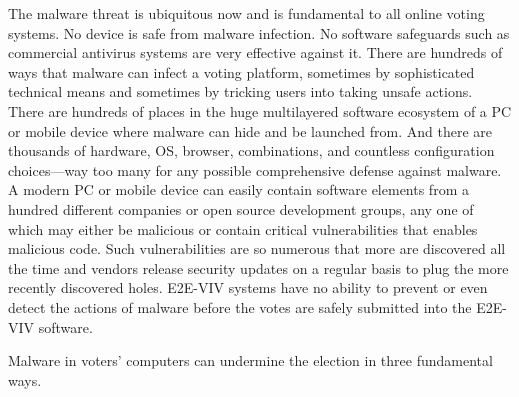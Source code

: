 The malware threat is ubiquitous now and is fundamental to all online
voting systems. No device is safe from malware infection. No software
safeguards such as commercial antivirus systems are very effective
against it. There are hundreds of ways that malware can infect a
voting platform, sometimes by sophisticated technical means and
sometimes by tricking users into taking unsafe actions. There are
hundreds of places in the huge multilayered software ecosystem of a PC
or mobile device where malware can hide and be launched from. And
there are thousands of hardware, OS, browser, combinations, and
countless configuration choices---way too many for any possible
comprehensive defense against malware. A modern PC or mobile device
can easily contain software elements from a hundred different
companies or open source development groups, any one of which may
either be malicious or contain critical vulnerabilities that enables
malicious code. Such vulnerabilities are so numerous that more are
discovered all the time and vendors release security updates on a
regular basis to plug the more recently discovered holes. E2E-VIV
systems have no ability to prevent or even detect the actions of
malware before the votes are safely submitted into the E2E-VIV
software.

Malware in voters' computers can undermine the election in three
fundamental ways. 

